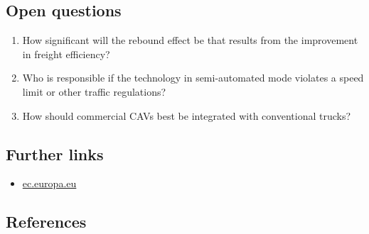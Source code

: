 \documentclass[
]{book}
\providecommand{\tightlist}{%
  \setlength{\itemsep}{0pt}\setlength{\parskip}{0pt}}
\begin{document}
\hypertarget{open-questions-22}{%
\subsection*{Open questions}\label{open-questions-22}}

\begin{enumerate}
\def\labelenumi{\arabic{enumi}.}
\tightlist
\item
  How significant will the rebound effect be that results from the improvement in freight efficiency?
\item
  Who is responsible if the technology in semi-automated mode violates a speed limit or other traffic regulations?
\item
  How should commercial CAVs best be integrated with conventional trucks?
\end{enumerate}

\hypertarget{further-links-20}{%
\subsection*{Further links}\label{further-links-20}}

\begin{itemize}
\tightlist
\item
  \href{https://ec.europa.eu/inea/en/horizon-2020/automated-road-transport}{ec.europa.eu}
\end{itemize}

\hypertarget{references-22}{%
\subsection*{References}\label{references-22}}
\end{document}
